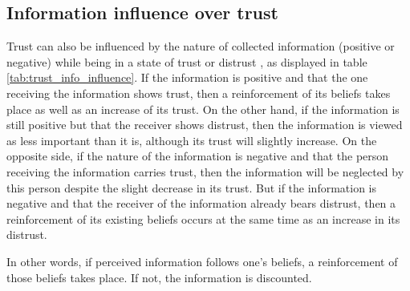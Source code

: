 \subsection{Information influence over trust}

Trust can also be influenced by the nature of collected information (positive or negative) while being in a state of trust or distrust \cite{cvetkovich_new_2002}, as displayed in table \ref{tab:trust_info_influence}. If the information is positive and that the one receiving the information shows trust, then a reinforcement of its beliefs takes place as well as an increase of its trust. On the other hand, if the information is still positive but that the receiver shows distrust, then the information is viewed as less important than it is, although its trust will slightly increase. On the opposite side, if the nature of the information is negative and that the person receiving the information carries trust, then the information will be neglected by this person despite the slight decrease in its trust. But if the information is negative and that the receiver of the information already bears distrust, then a reinforcement of its existing beliefs occurs at the same time as an increase in its distrust.

In other words, if perceived information follows one's beliefs, a reinforcement of those beliefs takes place. If not, the information is discounted.

